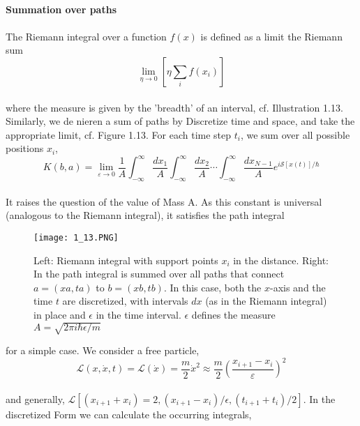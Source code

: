 \\
\textbf{Summation over paths}\\\\
The Riemann integral over a function $f (x)$ is defined as a limit the Riemann sum
\\
\begin{equation}
\lim _{\eta \rightarrow 0}\left[\eta \sum_{i} f\left(x_{i}\right)\right]
\end{equation}\\
where the measure is given by the 'breadth' of an interval, cf. Illustration
1.13. Similarly, we de nieren a sum of paths by
Discretize time and space, and take the appropriate limit, cf.
Figure 1.13. For each time step $t_i$, we sum over all possible positions $x_i$,
\\
\begin{equation}
K(b, a)=\lim _{\varepsilon \rightarrow 0} \frac{1}{A} \int_{-\infty}^{\infty} \frac{d x_{1}}{A} \int_{-\infty}^{\infty} \frac{d x_{2}}{A} \cdots \int_{-\infty}^{\infty} \frac{d x_{N-1}}{A} e^{i \mathcal{S}[x(t)] / \hbar}
\end{equation}\\
It raises the question of the value of Mass A. As this constant
is universal (analogous to the Riemann integral), it satisfies the path integral
\begin{figure}[ht]
    \centering
    \texttt{[image: 1\_13.PNG]}
    \caption{Left: Riemann integral with support points $x_i$ in the distance. Right: In the path integral is summed over all paths that connect $a = (xa, ta)$ to $b = (xb, tb)$. In this case, both the $x$-axis and the time $t$ are discretized, with intervals $dx$ (as in the Riemann integral) in place and $\epsilon$ in the time interval. $\epsilon$ defines the measure $A=\sqrt{2\pi i\hbar\epsilon/m}$}
    \label{fig:1.13}
\end{figure}
for a simple case. We consider a free particle,
\\
$$
\mathcal{L}(x, \dot{x}, t)=\mathcal{L}(\dot{x})=\frac{m}{2} \dot{x}^{2} \approx \frac{m}{2}\left(\frac{x_{i+1}-x_{i}}{\varepsilon}\right)^{2}
$$\\
and generally, $\mathcal{L}[(x_{i + 1} + x_i) = 2, (x_{i + 1}- x_i) /\epsilon, (t_{i + 1} + t_i) / 2]$. In the discretized
Form we can calculate the occurring integrals,
\\
